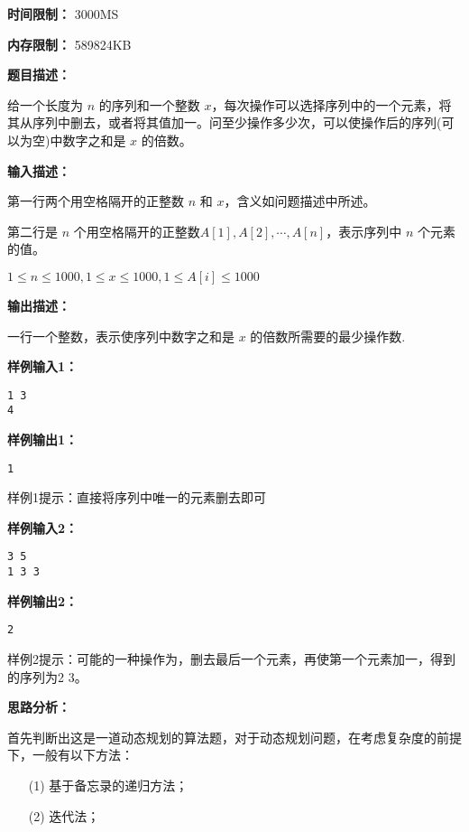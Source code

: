 \documentclass[a4paper]{ctexart}
\begin{document}
\noindent\textbf{时间限制：} 3000MS

\noindent\textbf{内存限制：} 589824KB

\vspace{10pt}

\noindent\textbf{题目描述：}

给一个长度为 $n$ 的序列和一个整数 $x$，每次操作可以选择序列中的一个元素，将其从序列中删去，或者将其值加一。问至少操作多少次，可以使操作后的序列(可以为空)中数字之和是 $x$ 的倍数。

\noindent\textbf{输入描述：}

第一行两个用空格隔开的正整数 $n$ 和 $x$，含义如问题描述中所述。

第二行是 $n$ 个用空格隔开的正整数$A[1], A[2], \cdots, A[n]$，表示序列中 $n$ 个元素的值。

$1 \leq n \leq 1000, 1 \leq x \leq 1000,1 \leq A[i] \leq 1000$

\noindent\textbf{输出描述：} 

一行一个整数，表示使序列中数字之和是 $x$ 的倍数所需要的最少操作数.

\noindent\textbf{样例输入1：}

\lstset{numbers=none}
\begin{lstlisting}
1 3
4
\end{lstlisting}
\lstset{numbers=left}

\noindent\textbf{样例输出1：}
\lstset{numbers=none}
\begin{lstlisting}
1
\end{lstlisting}
\lstset{numbers=left}

样例1提示：直接将序列中唯一的元素删去即可

\noindent\textbf{样例输入2：}

\lstset{numbers=none}
\begin{lstlisting}
3 5
1 3 3
\end{lstlisting}
\lstset{numbers=left}

\noindent\textbf{样例输出2：}
\lstset{numbers=none}
\begin{lstlisting}
2
\end{lstlisting}
\lstset{numbers=left}

样例2提示：可能的一种操作为，删去最后一个元素，再使第一个元素加一，得到的序列为2 3。

\vspace{10pt}

\noindent\textbf{思路分析：}

首先判断出这是一道动态规划的算法题，对于动态规划问题，在考虑复杂度的前提下，一般有以下方法：
\begin{itemize}
	\item[(1)] 基于备忘录的递归方法；
	\item[(2)] 迭代法；
\end{itemize}
\end{document}
